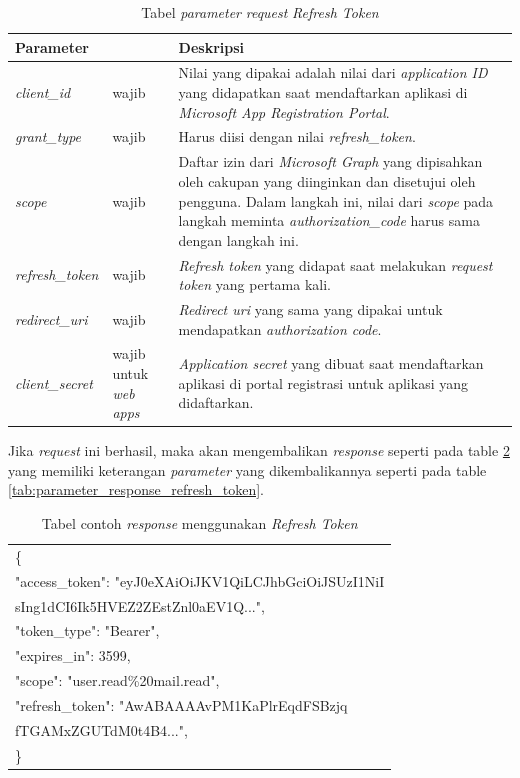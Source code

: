 \begin{table}[H]
	\centering 
	\caption{Tabel \textit{parameter} \textit{request} \textit{Refresh Token}}
	\label{tab:parameter_request_refresh_token}
	\begin{tabular}{|p{3cm}|p{3cm}|p{9cm}|}
	\toprule
	 \textbf{Parameter} & & \textbf{Deskripsi}\\ \hline 
	\textit{client\_id} & wajib & Nilai yang dipakai adalah nilai dari \textit{application ID} yang didapatkan saat mendaftarkan aplikasi di \textit{Microsoft App Registration Portal}.\\ \hline 
	\textit{grant\_type} & wajib & Harus diisi dengan nilai \textit{refresh\_token}. \\ \hline
	\textit{scope} & wajib & Daftar izin dari \textit{Microsoft Graph} yang dipisahkan oleh cakupan yang diinginkan dan disetujui oleh pengguna. Dalam langkah ini, nilai dari \textit{scope} pada langkah meminta \textit{authorization\_code} harus sama dengan langkah ini.  \\ \hline 
	\textit{refresh\_token} & wajib & \textit{Refresh token} yang didapat saat melakukan \textit{request token} yang pertama kali. \\ \hline  
	\textit{redirect\_uri} & wajib & \textit{Redirect uri} yang sama yang dipakai untuk mendapatkan \textit{authorization code}. \\ \hline 
	\textit{client\_secret} & wajib untuk \textit{web apps} & \textit{Application secret} yang dibuat saat mendaftarkan aplikasi di portal registrasi untuk aplikasi yang didaftarkan.\\
	\bottomrule
	\end{tabular}  
\end{table}

Jika \textit{request} ini berhasil, maka akan mengembalikan \textit{response} seperti pada table \ref{tab:contoh_response_refresh_token} yang memiliki keterangan \textit{parameter} yang dikembalikannya seperti pada table \ref{tab:parameter_response_refresh_token}. 
\\
\begin{table}[H]
	\centering 
	\caption{Tabel contoh \textit{response} menggunakan \textit{Refresh Token}}
	\label{tab:contoh_response_refresh_token}
	\begin{tabular}{|p{12cm}|}
	\toprule
	\{\\
    "access\_token": "eyJ0eXAiOiJKV1QiLCJhbGciOiJSUzI1NiI\\
    sIng1dCI6Ik5HVEZ2ZEstZnl0aEV1Q...",\\
    "token\_type": "Bearer",\\
    "expires\_in": 3599,\\
    "scope": "user.read\%20mail.read",\\
    "refresh\_token": "AwABAAAAvPM1KaPlrEqdFSBzjq\\
    fTGAMxZGUTdM0t4B4...",\\
\}\\
	\bottomrule
	\end{tabular}  
\end{table}

